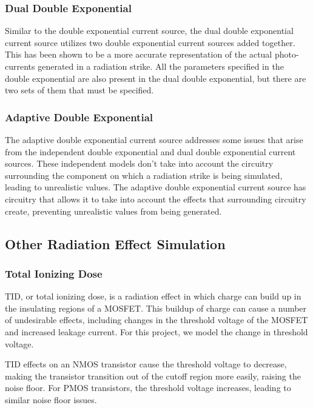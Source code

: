 \documentclass[12pt]{article}
\begin{document}
    \subsubsection{Dual Double Exponential}
    Similar to the double exponential current source, the dual double exponential current source utilizes two double exponential current sources added together.
    This has been shown to be a more accurate representation of the actual photo-currents generated in a radiation strike.
    All the parameters specified in the double exponential are also present in the dual double exponential, but there are two sets of them that must be specified.

    \subsubsection{Adaptive Double Exponential}
    The adaptive double exponential current source addresses some issues that arise from the independent double exponential and dual double exponential current sources.
    These independent models don't take into account the circuitry surrounding the component on which a radiation strike is being simulated, leading to unrealistic values.
    The adaptive double exponential current source has circuitry that allows it to take into account the effects that surrounding circuitry create, preventing unrealistic values from being generated.

    \subsection{Other Radiation Effect Simulation}\label{subsec:other-radiation-effect-simulation}

    \subsubsection{Total Ionizing Dose}
    TID, or total ionizing dose, is a radiation effect in which charge can build up in the insulating regions of a MOSFET. This buildup of charge can cause a number of undesirable effects, including changes in the threshold voltage of the MOSFET and increased leakage current.
    For this project, we model the change in threshold voltage.

    TID effects on an NMOS transistor cause the threshold voltage to decrease, making the transistor transition out of the cutoff region more easily, raising the noise floor.
    For PMOS transistors, the threshold voltage increases, leading to similar noise floor issues.
\end{document}
